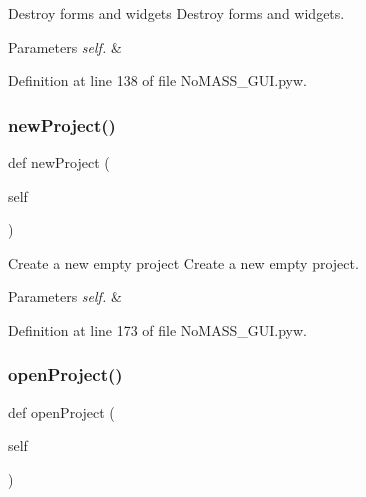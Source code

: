 Destroy forms and widgets Destroy forms and widgets. 


\begin{DoxyParams}{Parameters}
{\em self.} & \\
\hline
\end{DoxyParams}


Definition at line 138 of file No\+M\+A\+S\+S\+\_\+\+G\+U\+I.\+pyw.

\mbox{\label{class_no_m_a_s_s___g_u_i_1_1_app_ae1e47083122a73b7f4ad716b42f165a7}} 
\subsubsection{\texorpdfstring{new\+Project()}{newProject()}}
{\footnotesize\ttfamily def new\+Project (\begin{DoxyParamCaption}\item[{}]{self }\end{DoxyParamCaption})}



Create a new empty project Create a new empty project. 


\begin{DoxyParams}{Parameters}
{\em self.} & \\
\hline
\end{DoxyParams}


Definition at line 173 of file No\+M\+A\+S\+S\+\_\+\+G\+U\+I.\+pyw.

\mbox{\label{class_no_m_a_s_s___g_u_i_1_1_app_a8027378f2d626f57d5832362b5712104}} 
\subsubsection{\texorpdfstring{open\+Project()}{openProject()}}
{\footnotesize\ttfamily def open\+Project (\begin{DoxyParamCaption}\item[{}]{self }\end{DoxyParamCaption})}




